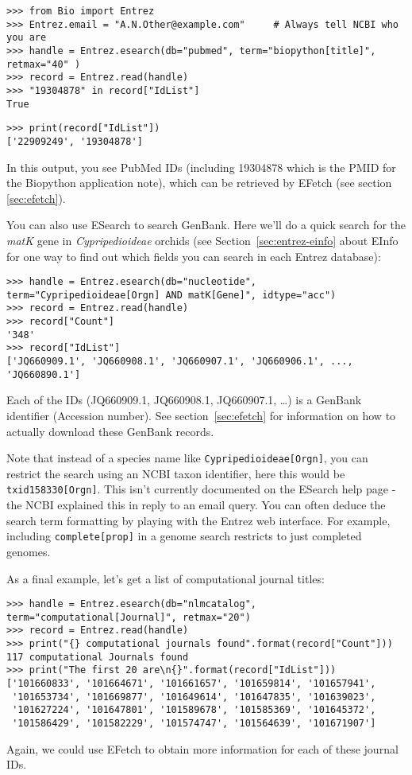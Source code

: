\begin{verbatim}
>>> from Bio import Entrez
>>> Entrez.email = "A.N.Other@example.com"     # Always tell NCBI who you are
>>> handle = Entrez.esearch(db="pubmed", term="biopython[title]", retmax="40" )
>>> record = Entrez.read(handle)
>>> "19304878" in record["IdList"]
True
\end{verbatim}
\begin{verbatim}
>>> print(record["IdList"])
['22909249', '19304878']
\end{verbatim}
In this output, you see PubMed IDs (including 19304878 which is the PMID for the Biopython application note), which can be retrieved by EFetch (see section \ref{sec:efetch}).

You can also use ESearch to search GenBank. Here we'll do a quick
search for the \emph{matK} gene in \emph{Cypripedioideae} orchids
(see Section~\ref{sec:entrez-einfo} about EInfo for one way to
find out which fields you can search in each Entrez database):

\begin{verbatim}
>>> handle = Entrez.esearch(db="nucleotide", term="Cypripedioideae[Orgn] AND matK[Gene]", idtype="acc")
>>> record = Entrez.read(handle)
>>> record["Count"]
'348'
>>> record["IdList"]
['JQ660909.1', 'JQ660908.1', 'JQ660907.1', 'JQ660906.1', ..., 'JQ660890.1']
\end{verbatim}

\noindent Each of the IDs (JQ660909.1, JQ660908.1, JQ660907.1, \ldots) is a GenBank identifier (Accession number).
See section~\ref{sec:efetch} for information on how to actually download these GenBank records.

Note that instead of a species name like \texttt{Cypripedioideae[Orgn]}, you can restrict the search using an NCBI taxon identifier, here this would be \texttt{txid158330[Orgn]}.  This isn't currently documented on the ESearch help page - the NCBI explained this in reply to an email query.  You can often deduce the search term formatting by playing with the Entrez web interface.  For example, including \texttt{complete[prop]} in a genome search restricts to just completed genomes.

As a final example, let's get a list of computational journal titles:
\begin{verbatim}
>>> handle = Entrez.esearch(db="nlmcatalog", term="computational[Journal]", retmax="20")
>>> record = Entrez.read(handle)
>>> print("{} computational journals found".format(record["Count"]))
117 computational Journals found
>>> print("The first 20 are\n{}".format(record["IdList"]))
['101660833', '101664671', '101661657', '101659814', '101657941',
 '101653734', '101669877', '101649614', '101647835', '101639023',
 '101627224', '101647801', '101589678', '101585369', '101645372',
 '101586429', '101582229', '101574747', '101564639', '101671907']
\end{verbatim}
Again, we could use EFetch to obtain more information for each of these journal IDs.

